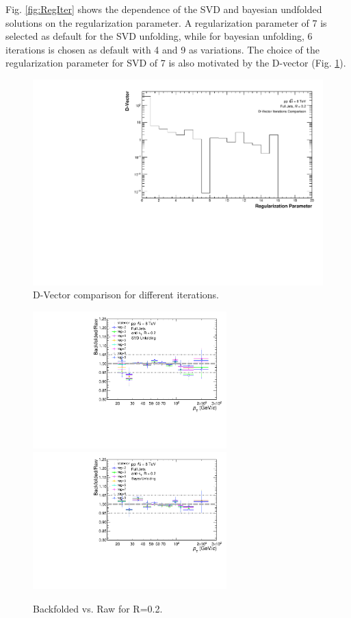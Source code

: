 Fig. \ref{fig:RegIter} shows the dependence of the SVD and bayesian undfolded solutions on the regularization parameter. A regularization parameter of 7 is selected as default for the SVD unfolding, while for bayesian unfolding, 6 iterations is chosen as default with 4 and 9 as variations. The choice of the regularization parameter for SVD of 7 is also motivated by the D-vector (Fig. \ref{fig:DVector}). 

\begin{figure}
    \centering
    \includegraphics[width=15cm]{figures/DVector/DVector_R02.pdf}
    \caption{D-Vector comparison for different iterations.}
    \label{fig:DVector}
\end{figure}

\begin{figure}
    \centering
    \begin{multicols}{2}
        \includegraphics[width=7.5cm]{figures/UnfoldingComparisons/BackfoldedVsRaw/RatioFoldRawSvd_R02.pdf}
    \vfill\null
    \columnbreak
        \includegraphics[width=7.5cm]{figures/UnfoldingComparisons/BackfoldedVsRaw/RatioFoldRawBayes_R02.pdf}
        \vfill\null
    \end{multicols}
    \caption{Backfolded vs. Raw for R=0.2.}
    \label{fig:BackfoldedRaw}
\end{figure}

